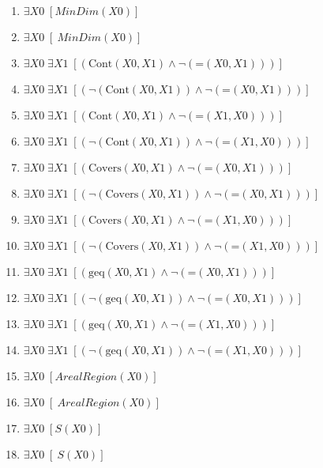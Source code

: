 \documentclass{article}
\begin{document}
\begin{enumerate}
\item $\exists X0\;  \left[ MinDim(X0) \right]$
\item $\exists X0\;  \left[ ~MinDim(X0) \right]$
\item $\exists X0\; \exists X1\;  \left[ \left(\textrm{Cont}(X0,X1) \land \neg \left(\textrm{=}(X0,X1)\right)\right) \right]$
\item $\exists X0\; \exists X1\;  \left[ \left(\neg \left(\textrm{Cont}(X0,X1)\right) \land \neg \left(\textrm{=}(X0,X1)\right)\right) \right]$
\item $\exists X0\; \exists X1\;  \left[ \left(\textrm{Cont}(X0,X1) \land \neg \left(\textrm{=}(X1,X0)\right)\right) \right]$
\item $\exists X0\; \exists X1\;  \left[ \left(\neg \left(\textrm{Cont}(X0,X1)\right) \land \neg \left(\textrm{=}(X1,X0)\right)\right) \right]$
\item $\exists X0\; \exists X1\;  \left[ \left(\textrm{Covers}(X0,X1) \land \neg \left(\textrm{=}(X0,X1)\right)\right) \right]$
\item $\exists X0\; \exists X1\;  \left[ \left(\neg \left(\textrm{Covers}(X0,X1)\right) \land \neg \left(\textrm{=}(X0,X1)\right)\right) \right]$
\item $\exists X0\; \exists X1\;  \left[ \left(\textrm{Covers}(X0,X1) \land \neg \left(\textrm{=}(X1,X0)\right)\right) \right]$
\item $\exists X0\; \exists X1\;  \left[ \left(\neg \left(\textrm{Covers}(X0,X1)\right) \land \neg \left(\textrm{=}(X1,X0)\right)\right) \right]$
\item $\exists X0\; \exists X1\;  \left[ \left(\textrm{geq}(X0,X1) \land \neg \left(\textrm{=}(X0,X1)\right)\right) \right]$
\item $\exists X0\; \exists X1\;  \left[ \left(\neg \left(\textrm{geq}(X0,X1)\right) \land \neg \left(\textrm{=}(X0,X1)\right)\right) \right]$
\item $\exists X0\; \exists X1\;  \left[ \left(\textrm{geq}(X0,X1) \land \neg \left(\textrm{=}(X1,X0)\right)\right) \right]$
\item $\exists X0\; \exists X1\;  \left[ \left(\neg \left(\textrm{geq}(X0,X1)\right) \land \neg \left(\textrm{=}(X1,X0)\right)\right) \right]$
\item $\exists X0\;  \left[ ArealRegion(X0) \right]$
\item $\exists X0\;  \left[ ~ArealRegion(X0) \right]$
\item $\exists X0\;  \left[ S(X0) \right]$
\item $\exists X0\;  \left[ ~S(X0) \right]$

\end{enumerate}
\end{document}
